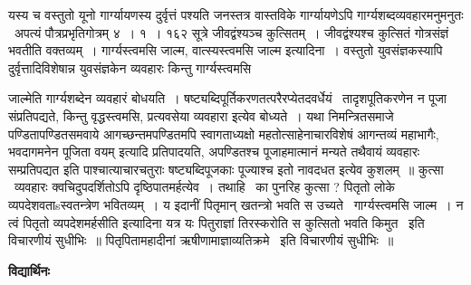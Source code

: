 \documentclass[11pt, openany]{book}
\begin{document}
यस्य च वस्तुतो यूनो गार्ग्यायणस्य दुर्वृत्तं पश्यति जनस्तत्र वास्तविके गार्ग्यायणेऽपि गार्ग्यशब्दव्यवहारमनुमनुतः \textendash\ अपत्यं पौत्रप्रभृतिगोत्रम् ४~। १~। १६२ सूत्रे {\qt जीवद्वंश्यञ्च कुत्सितम्~। जीवद्वंश्यश्च कुत्सितं गोत्रसंज्ञं भवतीति वक्तव्यम्~। गार्ग्यस्त्वमसि जाल्म, वात्स्यस्त्वमसि जाल्म} इत्यादिना~। वस्तुतो युवसंज्ञकस्यापि दुर्वृत्तादिविशेषान्न युवसंज्ञकेन व्यवहारः किन्तु गार्ग्यस्त्वमसि

\newpage

\noindent
जाल्मेति गार्ग्यशब्देन व्यवहारं बोधयति~। षष्ट्यब्दिपूर्तिकरणतत्परैरप्येतदवर्धेयं \textendash\ तादृशपूतिकरणेन न पूजा संप्रतिपद्यते, किन्तु वृद्धस्त्वमसि, प्रत्यवसेया व्यवहारा इत्येव बोध्यते~। यथा निमन्त्रितसमाजे पण्डितापण्डितसमवाये आगच्छन्तमपण्डितमपि स्वागताध्यक्षो महतोत्साहेनाचारविशेषं {\qt आगन्तव्यं महाभागैः, भवदागमनेन पूजिता वयम्} इत्यादि प्रतिपादयति, अपण्डितश्च पूजाहमात्मानं मन्यते तथैवायं व्यवहारः सम्प्रतिपद्यत इति पाश्चात्याचारचतुराः षष्ट्यब्दिपूजकाः पूज्याश्च इतो नावदधत इत्येव कुशलम्~॥ कुत्सा \textendash\ व्यवहारः क्वचिदुपदर्शितोऽपि दृष्ठिपातमर्हत्येव~। तथाहि \textendash\ {\qt का पुनरिह कुत्सा ? पितृतो लोके व्यपदेशवताsस्वतन्त्रेण भवितव्यम्~। य इदानीं पितृमान् खतन्त्रो भवति स उच्यते \textendash\ गार्ग्यस्त्वमसि जाल्म~। न त्वं पितृतो व्यपदेशमर्हसीति} इत्यादिना यत्र यः पितुराज्ञां तिरस्करोति स कुत्सितो भवति किमुत \textendash\ इति विचारणीयं सुधीभिः~॥ पितृपितामहादीनां ऋषीणामाज्ञाव्यतिक्रमे \textendash\ इति विचारणीयं सुधीभिः~॥

\begin{center}
\textbf{\Large विद्यार्थिनः \textendash\ }
\end{center}
\end{document}
